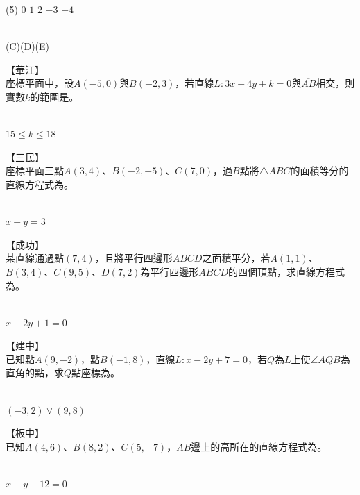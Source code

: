 \documentclass
[answers]
{exam}
\newcommand\ul[1]{\uline{\hspace*{#1}}}
\theoremstyle{definition}
\begin{document}
\begin{questions}
\begin{tasks}(5)
	\task $0$
	\task $1$
	\task $2$
	\task $-3$
	\task $-4$
\end{tasks}


\begin{solution}~\\
	(C)(D)(E)
\end{solution}

\question
【華江】\\
座標平面中，設$A\left( -5,0\right)$與$B\left( -2,3\right)$，若直線$L:3x-4y+k=0$與$\overline{AB}$相交，則實數$k$的範圍是\ul{50pt}。

\begin{solution}~\\
	$15 \leq k \leq 18$
\end{solution}

\question
【三民】\\
座標平面三點$A\left( 3,4\right)$、$B\left( -2,-5\right)$、$C\left( 7,0\right)$，過$B$點將$\triangle ABC$的面積等分的直線方程式為\ul{50pt}。

\begin{solution}~\\
	$x-y=3$
\end{solution}

\question
【成功】\\
某直線通過點$\left( 7,4\right)$，且將平行四邊形$ABCD$之面積平分，若$A\left( 1,1\right)$、$B\left( 3,4\right)$、$C\left( 9,5\right)$、$D\left( 7,2\right)$為平行四邊形$ABCD$的四個頂點，求直線方程式為\ul{50pt}。
\begin{solution}~\\
	$x-2y+1=0$
\end{solution}

\question
【建中】\\
已知點$A\left( 9,-2\right)$，點$B\left( -1,8\right)$，直線$L:x-2y+7=0$，若$Q$為$L$上使$\angle AQB$為直角的點，求$Q$點座標為\ul{50pt}。
\begin{solution}~\\
	$\left( -3,2 \right) \vee \left( 9,8 \right)$
\end{solution}

\question
【板中】\\
已知$A\left( 4,6\right)$、$B\left( 8,2\right)$、$C\left( 5,-7\right)$，$\overline{AB}$邊上的高所在的直線方程式為\ul{50pt}。
\begin{solution}~\\
	$x-y-12=0$
\end{solution}


\end{questions}
\end{document}
